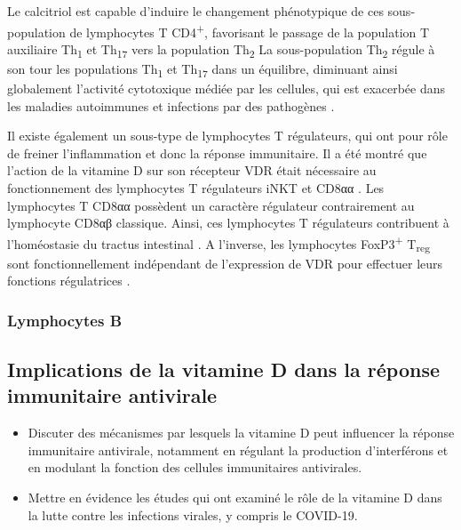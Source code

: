 \documentclass[
  a4paper,
  DIV=11,
  numbers=noendperiod,
  listof=totoc]{scrreprt}
\begin{document}
Le calcitriol est capable d'induire le changement phénotypique de ces
sous-population de lymphocytes T CD4\textsuperscript{+}, favorisant le
passage de la population T auxiliaire Th\textsubscript{1} et
Th\textsubscript{17} vers la population Th\textsubscript{2} La
sous-population Th\textsubscript{2} régule à son tour les populations
Th\textsubscript{1} et Th\textsubscript{17} dans un équilibre, diminuant
ainsi globalement l'activité cytotoxique médiée par les cellules, qui
est exacerbée dans les maladies autoimmunes et infections par des
pathogènes \autocite{Meza-Meza.2022}.

Il existe également un sous-type de lymphocytes T régulateurs, qui ont
pour rôle de freiner l'inflammation et donc la réponse immunitaire. Il a
été montré que l'action de la vitamine D sur son récepteur VDR était
nécessaire au fonctionnement des lymphocytes T régulateurs iNKT et CD8αα
\autocite{Cheroutre.2008}. Les lymphocytes T CD8αα possèdent un
caractère régulateur contrairement au lymphocyte CD8αβ classique. Ainsi,
ces lymphocytes T régulateurs contribuent à l'homéostasie du tractus
intestinal \autocite{Cantorna.2010}. A l'inverse, les lymphocytes
FoxP3\textsuperscript{+} T\textsubscript{reg} sont fonctionnellement
indépendant de l'expression de VDR pour effectuer leurs fonctions
régulatrices \autocite{Cantorna.2010}.

\hypertarget{lymphocytes-b}{%
\subsubsection{Lymphocytes B}\label{lymphocytes-b}}

\hypertarget{implications-de-la-vitamine-d-dans-la-ruxe9ponse-immunitaire-antivirale}{%
\subsection{Implications de la vitamine D dans la réponse immunitaire
antivirale}\label{implications-de-la-vitamine-d-dans-la-ruxe9ponse-immunitaire-antivirale}}

\begin{itemize}
\item
  Discuter des mécanismes par lesquels la vitamine D peut influencer la
  réponse immunitaire antivirale, notamment en régulant la production
  d'interférons et en modulant la fonction des cellules immunitaires
  antivirales.
\item
  Mettre en évidence les études qui ont examiné le rôle de la vitamine D
  dans la lutte contre les infections virales, y compris le COVID-19.
\end{itemize}
\end{document}
